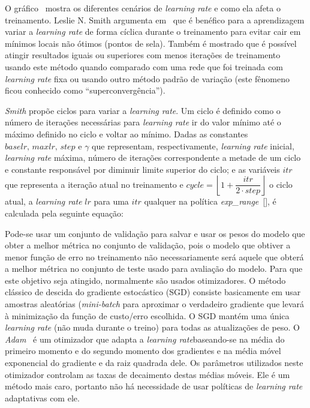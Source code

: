 O gráfico~ mostra os diferentes cenários de \textit{learning rate} e como ela afeta o treinamento.
Leslie N. Smith argumenta em~\cite{smith2017cyclical} que é benéfico para a aprendizagem variar a \textit{learning rate} de forma cíclica durante o treinamento para evitar cair em mínimos locais não ótimos (pontos de sela). Também é mostrado que é possível atingir resultados iguais ou superiores com menos iterações de treinamento usando este método quando comparado com uma rede que foi treinada com \textit{learning rate} fixa ou usando outro método padrão de variação (este fênomeno ficou conhecido como ``superconvergência'').

\textit{Smith} propõe ciclos para variar a \textit{learning rate}. Um ciclo é definido como o número de iterações necessárias para \textit{learning rate} ir do valor mínimo até o máximo definido no ciclo e voltar ao mínimo. Dadas as constantes $baselr,\, maxlr,\, step \text{ e } \gamma$ que representam, respectivamente, \textit{learning rate} inicial, \textit{learning rate} máxima, número de iterações correspondente a metade de um ciclo e constante responsável por diminuir limite superior do ciclo; e as variáveis $itr$ que representa a iteração atual no treinamento e $cycle = \left\lfloor1 + \dfrac{itr}{2 \cdot step}\right\rfloor$ o ciclo atual, a \textit{learning rate} $lr$ para uma $itr$ qualquer na política \textit{exp\_range}~[], é calculada pela seguinte equação:

Pode-se usar um conjunto de validação para salvar e usar os pesos do modelo que obter a melhor métrica no conjunto de validação, pois o modelo que obtiver a menor função de erro no treinamento não necessariamente será aquele que obterá a melhor métrica no conjunto de teste usado para avaliação do modelo. Para que este objetivo seja atingido, normalmente são usados otimizadores. O método clássico de descida do gradiente estocástico (\acrshort{SGD}) consiste basicamente em usar amostras aleatórias (\textit{mini-batch} para aproximar o verdadeiro gradiente que levará à minimização da função de custo/erro escolhida. O \acrshort{SGD} mantém uma única \textit{learning rate} (não muda durante o treino) para todas as atualizações de peso. O \textit{Adam}~\cite{kingma2014adam} é um otimizador que adapta a \textit{learning rate}baseando-se na média do primeiro momento e do segundo momento dos gradientes e na média móvel exponencial do gradiente e da raiz quadrada dele. Os parâmetros utilizados neste otimizador controlam as taxas de decaimento destas médias móveis. Ele é um método mais caro, portanto não há necessidade de usar políticas de \textit{learning rate} adaptativas com ele.
